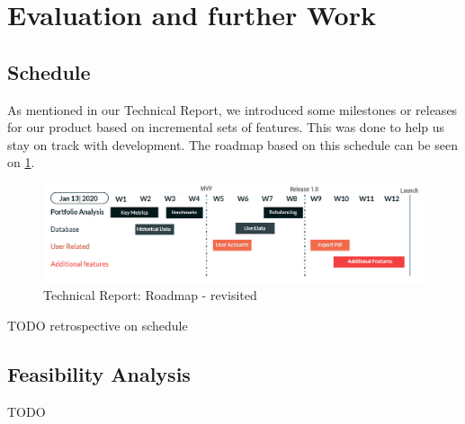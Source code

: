 \documentclass[main.tex]{subfiles}
\begin{document}
\section{Evaluation and further Work}
\subsection{Schedule}
As mentioned in our Technical Report, we introduced some milestones or releases for our product based on incremental sets of features. This was done to help us stay on track with development. The roadmap based on this schedule can be seen on \figurename{\ref{Roadmap}}.

\begin{figure}[H]
   \centering
   \includegraphics[width=\textwidth]{05Coding/05Pictures/initial_roadmap.jpg}
   \caption{Technical Report: Roadmap - revisited}
   \label{Roadmap}
\end{figure}

TODO retrospective on schedule

\subsection{Feasibility Analysis}
TODO
\end{document}
